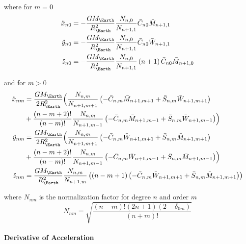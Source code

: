 where for $m=0$
\begin{equation}
  \begin{aligned}
    \ddot{x}_{n0} &= -\frac{GM_{\Earth}}{R^2_{\Earth}} \frac{N_{n,0}}{N_{n+1,1}}\bar{C}_{n0}\bar{M}_{n+1,1} \\
    \ddot{y}_{n0} &= -\frac{GM_{\Earth}}{R^2_{\Earth}} \frac{N_{n,0}}{N_{n+1,1}}\bar{C}_{n0}\bar{W}_{n+1,1} \\
    \ddot{z}_{n0} &= -\frac{GM_{\Earth}}{R^2_{\Earth}} \frac{N_{n,0}}{N_{n+1,1}} \left(n+1\right) \bar{C}_{n0}\bar{M}_{n+1,0}
  \end{aligned}
\end{equation}

and for $m > 0$
\begin{equation}
  \begin{aligned}
    \ddot{x}_{nm} &= \frac{GM_{\Earth}}{2R^2_{\Earth}} \Bigl( \frac{N_{n,m}}{N_{n+1,m+1}} 
      \left(-\bar{C}_{n,m} \bar{M}_{n+1,m+1} + \bar{S}_{n,m} \bar{W}_{n+1,m+1} \right) \\
       & +\frac{(n-m+2)!}{(n-m)!} \frac{N_{n,m}}{N_{n+1,m-1}}
        \left(-\bar{C}_{n,m} \bar{M}_{n+1,m-1} + \bar{S}_{n,m} \bar{W}_{n+1,m-1} \right) \Bigr) \\
    \ddot{y}_{nm} &= \frac{GM_{\Earth}}{2R^2_{\Earth}} \Bigl( \frac{N_{n,m}}{N_{n+1,m+1}} 
      \left(-\bar{C}_{n,m} \bar{W}_{n+1,m+1} + \bar{S}_{n,m} \bar{M}_{n+1,m+1} \right) \\
       & +\frac{(n-m+2)!}{(n-m)!} \frac{N_{n,m}}{N_{n+1,m-1}}
        \left(-\bar{C}_{n,m} \bar{W}_{n+1,m-1} + \bar{S}_{n,m} \bar{M}_{n+1,m-1} \right) \Bigr) \\
    \ddot{z}_{nm} &= \frac{GM_{\Earth}}{R^2_{\Earth}} \frac{N_{n,m}}{N_{n+1,m}} 
      \left( \left( n-m+1 \right)
      \left(-\bar{C}_{n,m} \bar{W}_{n+1,m+1} + \bar{S}_{n,m} \bar{M}_{n+1,m+1} \right) 
        \right)
  \end{aligned}
\end{equation}

where $N_{nm}$ is the normalization factor for degree $n$ and order $m$
\begin{equation}
  N_{nm} = \sqrt{ \frac{(n-m)! (2n+1) (2-\delta _{0m})}{(n+m)!} }
\end{equation}

\paragraph{Derivative of Acceleration}\label{sssec:derivative-geopotential-acceleration}

